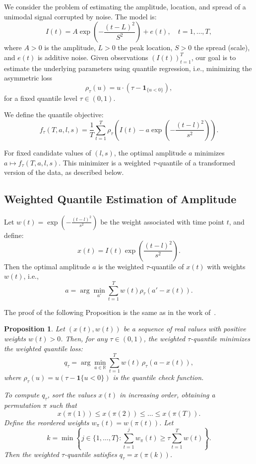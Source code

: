 \documentclass[12pt,a4paper]{article}
\newtheorem{proposition}{Proposition}
\begin{document}
	We consider the problem of estimating the amplitude, location, and spread of a unimodal signal corrupted by noise. The model is:
	\[
	I(t) = A \exp\left(-\frac{(t - L)^2}{S^2}\right) + e(t), \quad t = 1, \dots, T,
	\]
	where \( A > 0 \) is the amplitude, \( L > 0 \) the peak location, \( S > 0 \) the spread (scale), and \( e(t) \) is additive noise. Given observations \( (I(t))_{t=1}^T \), our goal is to estimate the underlying parameters using quantile regression, i.e., minimizing the asymmetric loss
	\[
	\rho_\tau(u) = u \cdot (\tau - \mathbf{1}_{\{u < 0\}}),
	\]
	for a fixed quantile level \( \tau \in (0,1) \).
	
	We define the quantile objective:
	\[
	f_\tau(T,a,l,s) = \frac{1}{T} \sum_{t=1}^T \rho_\tau\left( I(t) - a \exp\left(-\frac{(t - l)^2}{s^2} \right) \right).
	\]
	
	For fixed candidate values of \( (l,s) \), the optimal amplitude \( a \) minimizes \( a \mapsto f_\tau(T,a,l,s) \). This minimizer is a weighted \(\tau\)-quantile of a transformed version of the data, as described below.
	
	\subsection{Weighted Quantile Estimation of Amplitude}
	\label{sec:weighted_median_method}
	
	Let \( w(t) = \exp\left( -\frac{(t - l)^2}{s^2} \right) \) be the weight associated with time point \( t \), and define:
	\[
	x(t) = I(t) \exp\left( \frac{(t - l)^2}{s^2} \right).
	\]
	Then the optimal amplitude \( a \) is the weighted \(\tau\)-quantile of \( x(t) \) with weights \( w(t) \), i.e.,
	\[
	a = \arg\min_{a'} \sum_{t=1}^T w(t) \rho_\tau(a' - x(t)).
	\]
	
	The proof of the following Proposition is the same as in the work of~\cite{Nov20}.
	\begin{proposition}
		\label{prop:weighted:quantile}
		Let \( (x(t), w(t)) \) be a sequence of real values with positive weights \( w(t) > 0 \). Then, for any \( \tau \in (0,1) \), the weighted \( \tau \)-quantile minimizes the weighted quantile loss:
		\[
		q_\tau = \arg\min_{a \in \mathbb{R}} \sum_{t=1}^T w(t)\, \rho_\tau(a - x(t)),
		\]
		where \( \rho_\tau(u) = u(\tau - \mathbf{1}\{u < 0\}) \) is the quantile check function.
		
		To compute \( q_\tau \), sort the values \( x(t) \) in increasing order, obtaining a permutation \( \pi \) such that
		\[
		x(\pi(1)) \leq x(\pi(2)) \leq \dots \leq x(\pi(T)).
		\]
		Define the reordered weights \( w_\pi(t) = w(\pi(t)) \). Let
		\[
		k = \min \left\{ j \in \{1, \dots, T\} : \sum_{t=1}^j w_\pi(t) \geq \tau \sum_{t=1}^T w(t) \right\}.
		\]
		Then the weighted \( \tau \)-quantile satisfies \( q_\tau = x(\pi(k)) \).
	\end{proposition}
	
\end{document}
